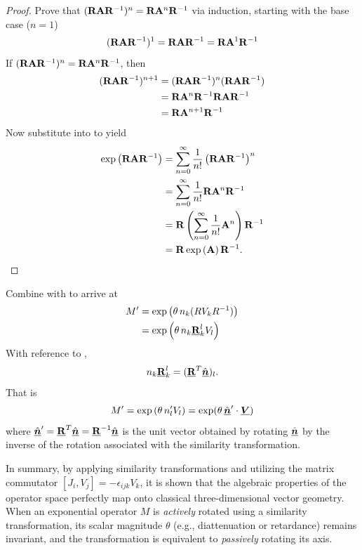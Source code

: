 \begin{proof}
Prove that $({\bf R} {\bf A} {\bf R}^{-1})^n = {\bf R} {\bf A}^n {\bf R}^{-1}$ via induction,
starting with the base case ($n=1$)
\begin{align*}
({\bf R} {\bf A} {\bf R}^{-1})^1 = {\bf R} {\bf A} {\bf R}^{-1} = {\bf R} {\bf A}^1 {\bf R}^{-1} 
\end{align*}
If $({\bf R} {\bf A} {\bf R}^{-1})^n = {\bf R} {\bf A}^n {\bf R}^{-1}$, then
\begin{align*}
({\bf R} {\bf A} {\bf R}^{-1})^{n+1} &= ({\bf R} {\bf A} {\bf R}^{-1})^n ({\bf R} {\bf A} {\bf R}^{-1}) \\
&= {\bf R} {\bf A}^n {\bf R}^{-1} {\bf R} {\bf A} {\bf R}^{-1} \\
&= {\bf R} {\bf A}^{n+1} {\bf R}^{-1} 
\end{align*}
%
Now substitute into  to yield
\begin{align}
\exp\left({\bf R} {\bf A} {\bf R}^{-1}\right)
& = \sum_{n=0}^\infty \frac{1}{n!} \left( {\bf R} {\bf A} {\bf R}^{-1} \right)^n \\
& = \sum_{n=0}^\infty \frac{1}{n!} {\bf R} {\bf A}^n {\bf R}^{-1} \\
& = {\bf R} \left( \sum_{n=0}^\infty \frac{1}{n!} {\bf A}^n \right) {\bf R}^{-1} \\
& = {\bf R} \exp\left(  {\bf A} \right) {\bf R}^{-1}.
\end{align}
\end{proof}
Combine with  to arrive at
\begin{equation}
\begin{split}
    M' &= \exp\left( \theta \, n_k (R V_k R^{-1}) \right) \\
       &= \exp\left( \theta \, n_k \underline{{\bf R}}_k^l V_l \right) 
\end{split}
\end{equation}
With reference to , 
\begin{equation}
n_k \underline{{\bf R}}_k^l = (\underline{{\bf R}}^T \hat{\underline{\mbox{\boldmath $n$}}})_l.
\end{equation}
That is
\begin{equation}
    M' = \exp\left( \theta\, n'_l V_l \right) = \exp( \theta \, \hat{\underline{\mbox{\boldmath $n$}}}' \cdot \underline{\mbox{\boldmath $V$}} )
\end{equation}
where $\hat{\underline{\mbox{\boldmath $n$}}}' = \underline{{\bf R}}^T \hat{\underline{\mbox{\boldmath $n$}}} = \underline{{\bf R}}^{-1} \hat{\underline{\mbox{\boldmath $n$}}}$ is
the unit vector obtained by rotating $\hat{\underline{\mbox{\boldmath $n$}}}$ by the inverse of the rotation associated with the similarity transformation.

In summary, by applying similarity transformations and utilizing the matrix commutator 
$[J_i, V_j] = -\epsilon_{ijk} V_k$, it is shown that the algebraic properties of the operator 
space perfectly map onto classical three-dimensional vector geometry. 
%
When an exponential operator $M$ is \emph{actively} rotated using a similarity transformation, 
its scalar magnitude $\theta$ (e.g., diattenuation or retardance) remains invariant, 
and the transformation is equivalent to \emph{passively} rotating its axis.

